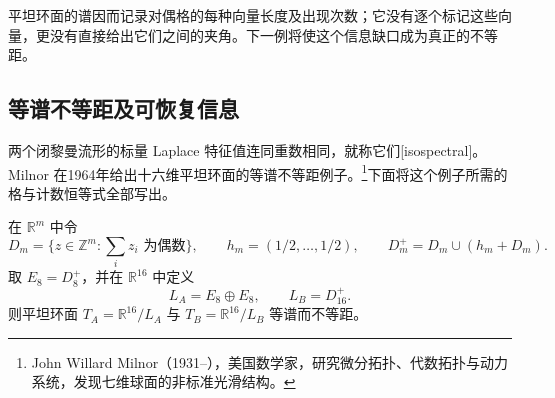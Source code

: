 平坦环面的谱因而记录对偶格的每种向量长度及出现次数；它没有逐个标记这些向量，更没有直接给出它们之间的夹角。下一例将使这个信息缺口成为真正的不等距。

\subsection{等谱不等距及可恢复信息}
\label{g3:subsec:1604:04}
两个闭黎曼流形的标量 Laplace 特征值连同重数相同，就称它们[isospectral]。Milnor 在1964年给出十六维平坦环面的等谱不等距例子。\footnote{John Willard Milnor（1931--），美国数学家，研究微分拓扑、代数拓扑与动力系统，发现七维球面的非标准光滑结构。}\cite[第542页]{Milnor1964Isospectral}下面将这个例子所需的格与计数恒等式全部写出。

\begin{example}\label{g3:exm:milnor-isospectral-tori}
	在 \(\mathbb R^m\) 中令
	\[
		D_m=\{z\in\mathbb Z^m:\textstyle\sum_i z_i\text{ 为偶数}\},\qquad
		h_m=(1/2,\ldots,1/2),\qquad
		D_m^+=D_m\cup(h_m+D_m).
	\]
	取 \(E_8=D_8^+\)，并在 \(\mathbb R^{16}\) 中定义
	\[
		L_A=E_8\oplus E_8,\qquad L_B=D_{16}^+.
	\]
	则平坦环面 \(T_A=\mathbb R^{16}/L_A\) 与 \(T_B=\mathbb R^{16}/L_B\) 等谱而不等距。
\end{example}
